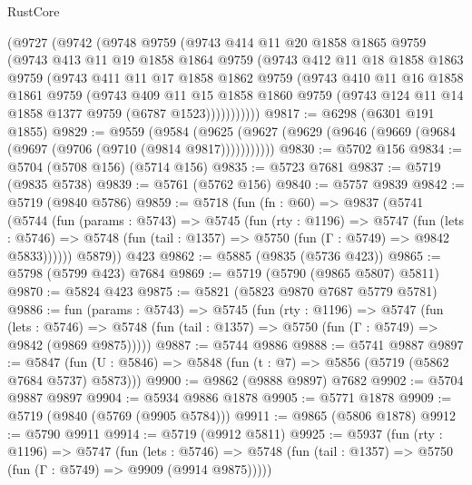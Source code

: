 \begin{lexlean}{RustCore}
\begin{coremodule}
    (@9727
      (@9742
        (@9748
          @9759
          (@9743
            @414
            @11
            @20
            @1858
            @1865
            @9759
            (@9743
              @413
              @11
              @19
              @1858
              @1864
              @9759
              (@9743
                @412
                @11
                @18
                @1858
                @1863
                @9759
                (@9743
                  @411
                  @11
                  @17
                  @1858
                  @1862
                  @9759
                  (@9743
                    @410
                    @11
                    @16
                    @1858
                    @1861
                    @9759
                    (@9743
                      @409
                      @11
                      @15
                      @1858
                      @1860
                      @9759
                      (@9743 @124 @11 @14 @1858 @1377 @9759 (@6787 @1523)))))))))))
@9817 := @6298 (@6301 @191 @1855)
@9829 := @9559
    (@9584 (@9625 (@9627 (@9629 (@9646 (@9669 (@9684 (@9697 (@9706 (@9710 (@9814 @9817)))))))))))
@9830 := @5702 @156
@9834 := @5704 (@5708 @156) (@5714 @156)
@9835 := @5723 @7681
@9837 := @5719 (@9835 @5738)
@9839 := @5761 (@5762 @156)
@9840 := @5757 @9839
@9842 := @5719 (@9840 @5786)
@9859 := @5718
    (fun (fn : @60) =>
    @9837
      (@5741
        (@5744
          (fun (params : @5743) =>
          @5745
            (fun (rty : @1196) =>
            @5747
              (fun (lets : @5746) =>
              @5748 (fun (tail : @1357) => @5750 (fun (Γ : @5749) => @9842 @5833))))))
        @5879))
    @423
@9862 := @5885 (@9835 (@5736 @423))
@9865 := @5798 (@5799 @423) @7684
@9869 := @5719 (@5790 (@9865 @5807) @5811)
@9870 := @5824 @423
@9875 := @5821 (@5823 @9870 @7687 @5779 @5781)
@9886 := fun (params : @5743) =>
  @5745
    (fun (rty : @1196) =>
    @5747
      (fun (lets : @5746) =>
      @5748 (fun (tail : @1357) => @5750 (fun (Γ : @5749) => @9842 (@9869 @9875)))))
@9887 := @5744 @9886
@9888 := @5741 @9887
@9897 := @5847 (fun (U : @5846) => @5848 (fun (t : @7) => @5856 (@5719 (@5862 @7684 @5737) @5873)))
@9900 := @9862 (@9888 @9897) @7682
@9902 := @5704 @9887 @9897
@9904 := @5934 @9886 @1878
@9905 := @5771 @1878
@9909 := @5719 (@9840 (@5769 (@9905 @5784)))
@9911 := @9865 (@5806 @1878)
@9912 := @5790 @9911
@9914 := @5719 (@9912 @5811)
@9925 := @5937
    (fun (rty : @1196) =>
    @5747
      (fun (lets : @5746) =>
      @5748 (fun (tail : @1357) => @5750 (fun (Γ : @5749) => @9909 (@9914 @9875)))))

\end{coremodule}
\end{lexlean}
